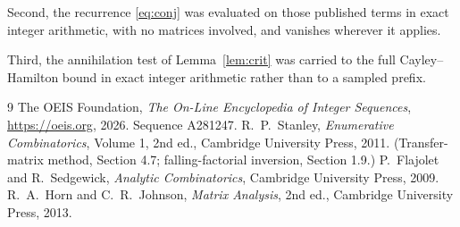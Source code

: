 \documentclass[11pt,a4paper]{article}
\theoremstyle{plain}
\theoremstyle{definition}
\begin{document}
Second, the recurrence \eqref{eq:conj} was evaluated on those published terms in exact
integer arithmetic, with no matrices involved, and vanishes wherever it applies.

Third, the annihilation test of Lemma~\ref{lem:crit} was carried to the full
Cayley--Hamilton bound in exact integer arithmetic rather than to a sampled prefix.

\begin{thebibliography}{9}
 The OEIS Foundation, \emph{The On-Line Encyclopedia of Integer
Sequences}, \url{https://oeis.org}, 2026. Sequence A281247.
 R.~P.~Stanley, \emph{Enumerative Combinatorics}, Volume 1, 2nd ed.,
Cambridge University Press, 2011. (Transfer-matrix method, Section 4.7; falling-factorial
inversion, Section 1.9.)
 P.~Flajolet and R.~Sedgewick, \emph{Analytic Combinatorics}, Cambridge
University Press, 2009.
 R.~A.~Horn and C.~R.~Johnson, \emph{Matrix Analysis}, 2nd ed., Cambridge
University Press, 2013.
\end{thebibliography}
\end{document}
